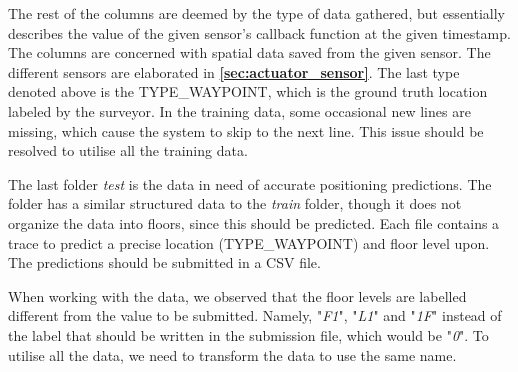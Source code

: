 The rest of the columns are deemed by the type of data gathered, but essentially describes the value of the given sensor's callback function at the given timestamp. The columns are concerned with spatial data saved from the given sensor. The different sensors are elaborated in \textbf{\autoref{sec:actuator_sensor}}. The last type denoted above is the TYPE\_WAYPOINT, which is the ground truth location labeled by the surveyor.\cite{KaggleDataGithub} In the training data, some occasional new lines are missing, which cause the system to skip to the next line. This issue should be resolved to utilise all the training data.\cite{KaggleData}

The last folder \textit{test} is the data in need of accurate positioning predictions. The folder has a similar structured data to the \textit{train} folder, though it does not organize the data into floors, since this should be predicted. Each file contains a trace to predict a precise location (TYPE\_WAYPOINT) and floor level upon. The predictions should be submitted in a CSV file.\cite{KaggleData}

When working with the data, we observed that the floor levels are labelled different from the value to be submitted. Namely, "\textit{F1}", "\textit{L1}" and "\textit{1F}" instead of the label that should be written in the submission file, which would be "\textit{0}". To utilise all the data, we need to transform the data to use the same name.